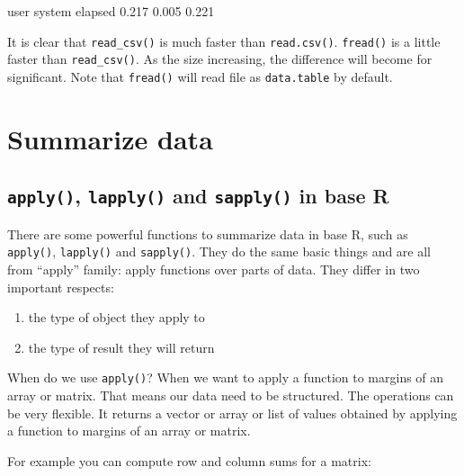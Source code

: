 \documentclass[12pt,]{krantz}
\makeatletter
\newenvironment{Shaded}{\begin{snugshade}}{\end{snugshade}}
\newcommand{\NormalTok}[1]{#1}
\providecommand{\tightlist}{%
  \setlength{\itemsep}{0pt}\setlength{\parskip}{0pt}}
\newenvironment{kframe}{%
\medskip{}
\setlength{\fboxsep}{.8em}
 \def\at@end@of@kframe{}%
 \ifinner\ifhmode%
  \def\at@end@of@kframe{\end{minipage}}%
  \begin{minipage}{\columnwidth}%
 \fi\fi%
 \def\FrameCommand##1{\hskip\@totalleftmargin \hskip-\fboxsep
 \colorbox{shadecolor}{##1}\hskip-\fboxsep
     \hskip-\linewidth \hskip-\@totalleftmargin \hskip\columnwidth}%
 \MakeFramed {\advance\hsize-\width
   \@totalleftmargin\z@ \linewidth\hsize
   \@setminipage}}%
 {\par\unskip\endMakeFramed%
 \at@end@of@kframe}
\renewenvironment{Shaded}{\begin{kframe}}{\end{kframe}}
\theoremstyle{definition}
\theoremstyle{definition}
\theoremstyle{definition}
\theoremstyle{remark}
\makeatother
\begin{document}
\begin{Shaded}
\begin{Highlighting}[]
\NormalTok{   user  system elapsed }
\NormalTok{  0.217   0.005   0.221 }
\end{Highlighting}
\end{Shaded}

It is clear that \texttt{read\_csv()} is much faster than
\texttt{read.csv()}. \texttt{fread()} is a little faster than
\texttt{read\_csv()}. As the size increasing, the difference will become
for significant. Note that \texttt{fread()} will read file as
\texttt{data.table} by default.

\section{Summarize data}\label{summarize-data}

\subsection{\texorpdfstring{\texttt{apply()}, \texttt{lapply()} and
\texttt{sapply()} in base
R}{apply(), lapply() and sapply() in base R}}\label{apply-lapply-and-sapply-in-base-r}

There are some powerful functions to summarize data in base R, such as
\texttt{apply()}, \texttt{lapply()} and \texttt{sapply()}. They do the
same basic things and are all from ``apply'' family: apply functions
over parts of data. They differ in two important respects:

\begin{enumerate}
\def\labelenumi{\arabic{enumi}.}
\tightlist
\item
  the type of object they apply to
\item
  the type of result they will return
\end{enumerate}

When do we use \texttt{apply()}? When we want to apply a function to
margins of an array or matrix. That means our data need to be
structured. The operations can be very flexible. It returns a vector or
array or list of values obtained by applying a function to margins of an
array or matrix.

For example you can compute row and column sums for a matrix:
\end{document}
